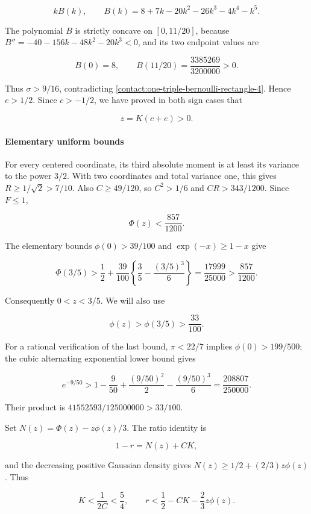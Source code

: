 \[
 k B(k),\qquad B(k)=8+7k-20k^2-26k^3-4k^4-k^5.
\]

The polynomial $B$ is strictly concave on $[0,11/20]$, because
$B''=-40-156k-48k^2-20k^3<0$, and its two endpoint values are

\[
 B(0)=8,\qquad B(11/20)=\frac{3385269}{3200000}>0.
\]

Thus $\sigma>9/16$, contradicting \eqref{contact:one-triple-bernoulli-rectangle-4}. Hence $e>1/2$. Since
$c>-1/2$, we have proved in both sign cases that

\[
 \boxed{\quad z=K(c+e)>0.\quad}
\tag{B.9.6}\label{contact:one-triple-bernoulli-rectangle-6}
\]

\paragraph{Elementary uniform bounds}

For every centered coordinate, its third absolute moment is at least
its variance to the power $3/2$. With two coordinates and total variance
one, this gives $R\ge 1/\sqrt{2}>7/10$. Also $C\ge49/120$, so
$C^2>1/6$ and $CR>343/1200$. Since $F\le 1$,

\[
 \Phi(z)<\frac{857}{1200}.
\]

The elementary bounds $\phi(0)>39/100$ and $\exp(-x)\ge 1-x$ give

\[
 \Phi(3/5)>
 \frac12+\frac{39}{100}\left\{\frac35-
                         \frac{(3/5)^3}{6}\right\}
 =\frac{17999}{25000}>\frac{857}{1200}.
\]

Consequently $0<z<3/5$. We will also use

\[
 \phi(z)>\phi(3/5)>\frac{33}{100}.
\tag{B.9.7}\label{contact:one-triple-bernoulli-rectangle-7}
\]

For a rational verification of the last bound, $\pi<22/7$ implies
$\phi(0)>199/500$; the cubic alternating exponential lower bound gives

\[
 e^{-9/50}>1-\frac9{50}+\frac{(9/50)^2}{2}
                    -\frac{(9/50)^3}{6}
 =\frac{208807}{250000}.
\]

Their product is $41552593/125000000>33/100$.

Set $N(z)=\Phi(z)-z \phi(z)/3$. The ratio identity is

\[
 1-r=N(z)+CK,
\]

and the decreasing positive Gaussian density gives
$N(z)\ge 1/2+(2/3)z \phi(z)$. Thus

\[
 K<\frac1{2C}<\frac54,
 \qquad r<\frac12-CK-\frac23z\phi(z).
\tag{B.9.8}\label{contact:one-triple-bernoulli-rectangle-8}
\]

